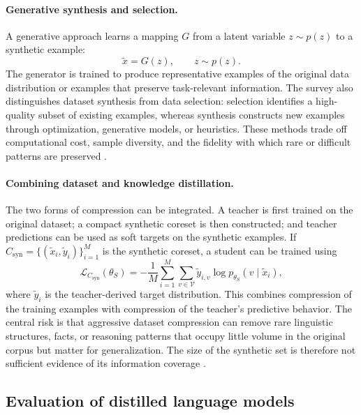 \paragraph{Generative synthesis and selection.}
A generative approach learns a mapping \(G\) from a latent variable
\(z\sim p(z)\) to a synthetic example:
\begin{equation}
    \widetilde x=G(z),
    \qquad z\sim p(z).
    \label{eq:distillation-generative-sample}
\end{equation}
The generator is trained to produce representative examples of the original
data distribution or examples that preserve task-relevant information.  The
survey also distinguishes dataset synthesis from data selection: selection
identifies a high-quality subset of existing examples, whereas synthesis
constructs new examples through optimization, generative models, or
heuristics.  These methods trade off computational cost, sample diversity,
and the fidelity with which rare or difficult patterns are preserved
\parencite{Fang2026KnowledgeDatasetDistillation}.

\paragraph{Combining dataset and knowledge distillation.}
The two forms of compression can be integrated.  A teacher is first trained
on the original dataset; a compact synthetic coreset is then constructed;
and teacher predictions can be used as soft targets on the synthetic
examples.  If
\(C_{\mathrm{syn}}=\{(\widetilde x_i,\widetilde y_i)\}_{i=1}^{M}\)
is the synthetic coreset, a student can be trained using
\begin{equation}
    \mathcal L_{C_{\mathrm{syn}}}(\theta_S)
    =-\frac{1}{M}\sum_{i=1}^{M}
    \sum_{v\in\mathcal V}
    \widetilde y_{i,v}
    \log p_{\theta_S}(v\mid\widetilde x_i),
    \label{eq:distillation-synthetic-soft-label-loss}
\end{equation}
where \(\widetilde y_i\) is the teacher-derived target distribution.
This combines compression of the training examples with compression of the
teacher's predictive behavior.  The central risk is that aggressive dataset
compression can remove rare linguistic structures, facts, or reasoning
patterns that occupy little volume in the original corpus but matter for
generalization.  The size of the synthetic set is therefore not sufficient
evidence of its information coverage
\parencite{Fang2026KnowledgeDatasetDistillation}.

\subsection{Evaluation of distilled language models}
\label{subsec:distillation-evaluation}

